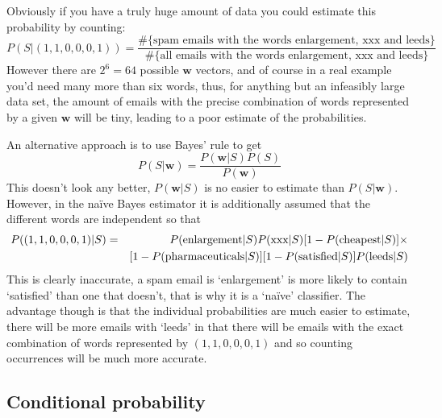 \documentclass[11pt,a4paper]{scrartcl}
\begin{document}
Obviously if you have a truly huge amount of data you could estimate this probability by counting:
\begin{equation}
P(S|(1,1,0,0,0,1))=\frac{\#\{\mbox{spam emails with the words enlargement, xxx and leeds}\}}{\#\{\mbox{all emails with the words enlargement, xxx and leeds}\}}
\end{equation}
However there are $2^6=64$ possible $\textbf{w}$ vectors, and of
course in a real example you'd need many more than six words, thus,
for anything but an infeasibly large data set, the amount of emails
with the precise combination of words represented by a given
$\textbf{w}$ will be tiny, leading to a poor estimate of the
probabilities.

An alternative approach is to use Bayes' rule to get
\begin{equation}
P(S|\textbf{w})=\frac{P(\textbf{w}|S)P(S)}{P(\textbf{w})}
\end{equation}
This doesn't look any better, $P(\textbf{w}|S)$ is no easier to
estimate than $P(S|\textbf{w})$. However, in the na\"{i}ve Bayes
estimator it is additionally assumed that the different words are
independent so that 
\begin{eqnarray}
P((1,1,0,0,0,1)|S)&=&P(\mbox{enlargement}|S)P(\mbox{xxx}|S)[1-P(\mbox{cheapest}|S)]\times\cr&&[1-P(\mbox{pharmaceuticals}|S)][1-P(\mbox{satisfied}|S)]P(\mbox{leeds}|S)
\end{eqnarray}
This is clearly inaccurate, a spam email is \lq{}enlargement\rq{} is
more likely to contain \lq{}satisfied\rq{} than one that doesn't, that
is why it is a \lq{}na\"ive\rq{} classifier. The advantage though is
that the individual probabilities are much easier to estimate, there
will be more emails with \lq{}leeds\rq{} in that there will be emails
with the exact combination of words represented by $(1,1,0,0,0,1)$
and so counting occurrences will be much more accurate.

\subsection*{Conditional probability}
\end{document}
